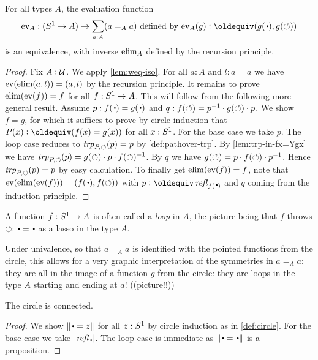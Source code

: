 \begin{lemma}\label{lem:freeloopspace}
For all types $A$, the evaluation function 
\[
\ev_A : (\Sc\to A)\to \sum_{a:A}(a=_Aa)\text{~defined by~} 
\ev_A(g)\defeq (g(\base),g(\Sloop))
\]
is an equivalence, with inverse $\mathrm{elim}_A$ defined by the recursion principle.  
\end{lemma}
\begin{proof}
Fix $A:\mathcal{U}$. We apply \cref{lem:weq-iso}. 
For all $a:A$ and $l:a=a$ we have $\mathrm{ev}(\mathrm{elim}(a,l))=(a,l)$
by the recursion principle. It remains to prove
$\mathrm{elim}(\mathrm{ev}(f))=f$ for all $f:{S^1}\to A$. This will follow
from the following more general result. Assume 
$p: f(\base)= g(\base)$ and $q: f(\circlearrowleft) = p^{-1}\cdot g(\circlearrowleft)\cdot p$.
We show $f=g$, for which it suffices to prove by circle induction
that $P(x)\defeq(f(x)=g(x))$ for all $x:{S^1}$.
For the base case we take $p$.
The loop case reduces to $\mathop{\mathit{trp}_{P,\circlearrowleft}}(p)=p$ by \cref{def:pathover-trp}.
By \cref{lem:trp-in-fx=Ygx} we have 
$\mathop{\mathit{trp}_{P,\circlearrowleft}}(p)=g(\circlearrowleft)\cdot p \cdot f(\circlearrowleft)^{-1}$. 
By $q$ we have $g(\circlearrowleft) = p\cdot f(\circlearrowleft) \cdot p^{-1}$.
Hence $\mathop{\mathit{trp}_{P,\circlearrowleft}}(p)=p$ by easy calculation.
To finally get $\mathrm{elim}(\mathrm{ev}(f))=f$,
note that $\ev(\el(\ev(f)))=(f(\base),f(\Sloop))$ with $p\defeq\refl{f(\base)}$
and $q$ coming from the induction principle.
\end{proof}

\begin{remark}
A function $f:{S^1}\to A$ is often called a \emph{loop} in $A$, 
the picture being that $f$ throws $\Sloop:\base=\base$ as a lasso in the type $A$.

  Under univalence, so that $a=_Aa$ is identified with the pointed functions 
from the circle, this allows for a very graphic interpretation of the 
symmetries in $a=_Aa$: they are all in the image of a function $g$ from 
the circle: they are loops in the type $A$ starting and ending at $a$! ((picture!!))
\end{remark}

\begin{lemma}\label{lem:circleisconnected}
  The circle is connected.
\end{lemma}
\begin{proof}
We show $\Trunc{\base=z}$ for all $z:{S^1}$ by circle induction
as in \cref{def:circle}.
For the base case we take $\trunc{\refl{\base}}$.
The loop case is immediate as $\Trunc{\base=\base}$ is a proposition.
\end{proof}

